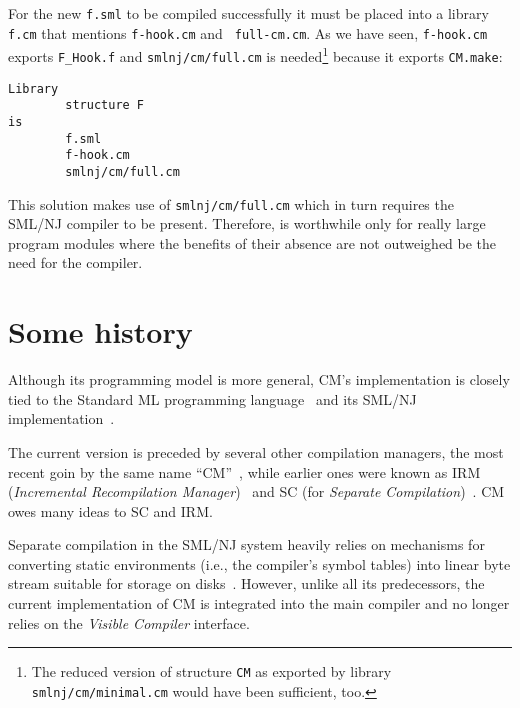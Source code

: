 \documentclass{article}
\begin{document}
For the new {\tt f.sml} to be compiled successfully it must be placed
into a library {\tt f.cm} that mentions {\tt f-hook.cm} and {\tt
full-cm.cm}.  As we have seen, {\tt f-hook.cm} exports {\tt F\_Hook.f}
and {\tt smlnj/cm/full.cm} is needed\footnote{The reduced version of
structure {\tt CM} as exported by library {\tt smlnj/cm/minimal.cm} would
have been sufficient, too.}  because it exports {\tt CM.make}:
\begin{verbatim}
Library
        structure F
is
        f.sml
        f-hook.cm
        smlnj/cm/full.cm
\end{verbatim}

  This solution makes use of {\tt smlnj/cm/full.cm}
which in turn requires the SML/NJ compiler to be present.  Therefore,
is worthwhile only for really large program modules where the benefits
of their absence are not outweighed be the need for the compiler.

\section{Some history}

Although its programming model is more general, CM's implementation is
closely tied to the Standard ML programming language~\cite{milner97}
and its SML/NJ implementation~\cite{appel91:sml}.

The current version is preceded by several other compilation managers,
the most recent goin by the same name ``CM''~\cite{blume95:cm}, while
earlier ones were known as IRM ({\it Incremental Recompilation
Manager})~\cite{harper94:irm} and SC (for {\it Separate
Compilation})~\cite{harper-lee-pfenning-rollins-CM}.  CM owes many
ideas to SC and IRM.

Separate compilation in the SML/NJ system heavily relies on mechanisms
for converting static environments (i.e., the compiler's symbol
tables) into linear byte stream suitable for storage on
disks~\cite{appel94:sepcomp}.  However, unlike all its predecessors,
the current implementation of CM is integrated into the main compiler
and no longer relies on the {\em Visible Compiler} interface.

\cleardoublepage

\tableofcontents

\pagebreak


\end{document}

